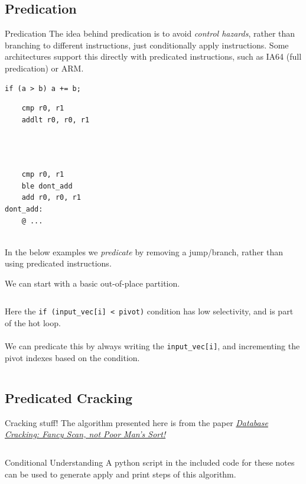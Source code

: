 \subsection{Predication}
\label{section:predication}
\begin{sidenotebox}{Predication}
    The idea behind predication is to avoid \textit{control hazards}, rather than branching to different instructions, just conditionally apply instructions.
    Some architectures support this directly with predicated instructions, such as IA64 (full predication) or ARM.
    \begin{verbatim}
if (a > b) a += b;
    \end{verbatim}
    \begin{minipage}[t]{.3\textwidth}
        \begin{verbatim}
    cmp r0, r1
    addlt r0, r0, r1


    
        \end{verbatim}
    \end{minipage} \begin{minipage}[t]{.3\textwidth}
        \begin{verbatim}
    cmp r0, r1
    ble dont_add 
    add r0, r0, r1
dont_add:
    @ ...
        \end{verbatim}
    \end{minipage}
    \\ In the below examples we \textit{predicate} by removing a jump/branch, rather than using predicated instructions.
\end{sidenotebox}
We can start with a basic out-of-place partition.
\inputminted[firstline=7]{cpp}{advanced_topics/code/partition_comparison/partitions/out_of_place_conditional.h}
Here the \texttt{if (input_vec[i] < pivot)} condition has low selectivity, and is part of the hot loop.
\\
\\ We can predicate this by always writing the \texttt{input_vec[i]}, and incrementing the pivot indexes based on the condition.
\inputminted[firstline=6]{cpp}{advanced_topics/code/partition_comparison/partitions/out_of_place_predicated.h}
\subsection{Predicated Cracking}
\begin{sidenotebox}{Cracking stuff!}
    The algorithm presented here is from the paper \href{https://core.ac.uk/download/pdf/301643658.pdf}{\textit{Database Cracking: Fancy Scan, not Poor Man's Sort!}}
\end{sidenotebox}
\inputminted[firstline=5]{cpp}{advanced_topics/code/partition_comparison/partitions/in_place_predicated.h}

\begin{sidenotebox}{Conditional Understanding}
    A python script in the included code for these notes can be used to generate apply and print steps of this algorithm.
\end{sidenotebox}
